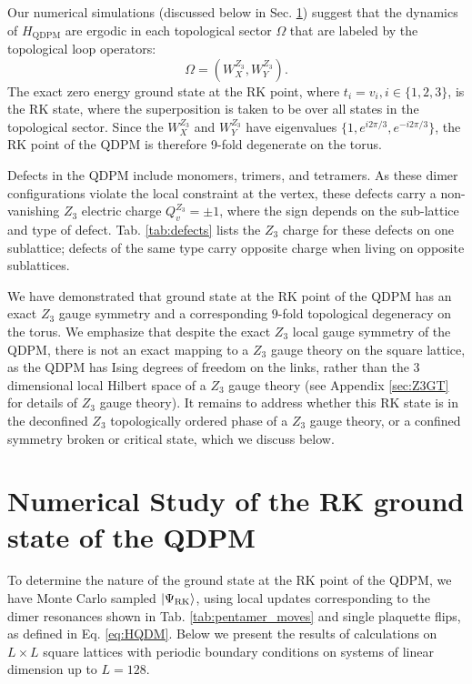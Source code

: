 \documentclass[twocolumn,prb,aps,floatfix,superscriptaddress]{revtex4-1}
\newcommand{\secref}[1]{Sec. \ref{#1}}
\newcommand{\tabref}[1]{Tab. \ref{#1}}
\newcommand{\appref}[1]{Appendix \ref{#1}}
\newcommand{\ket}[1]{| #1 \rangle}
\newcommand{\Eqref}[1]{Eq. \eqref{#1}}
\newcommand{\HQDPM}{H_\mathrm{QDPM}}
\begin{document}
Our numerical simulations (discussed below in \secref{sec:numerics}) suggest that the dynamics of $\HQDPM$ are ergodic in each topological sector $\Omega$ that are labeled by the topological loop operators:
\begin{equation}
\Omega = \left(W_X^{Z_3},W_Y^{Z_3} \right).
\end{equation}
The exact zero energy ground state at the RK point, where $t_i=v_i, i \in \{ 1,2,3\}$, is the RK state, where the superposition is taken to be over all states in the topological sector. Since the $W_{X}^{Z_3}$ and  $W_{Y}^{Z_3}$ have eigenvalues $\{1,e^{i2\pi/3},e^{-i2\pi/3}\}$, the RK point of the QDPM is therefore 9-fold degenerate on the torus.

Defects in the QDPM include monomers, trimers, and tetramers. As these dimer configurations violate the local constraint at the vertex, these defects carry a non-vanishing $Z_3$ electric charge $Q_v^{Z_3} = \pm 1$, where the sign depends on the sub-lattice and type of defect. \tabref{tab:defects} lists the $Z_3$ charge for these defects on one sublattice; defects of the same type carry opposite charge when living on opposite sublattices.

We have demonstrated that ground state at the RK point of the QDPM has an exact $Z_3$ gauge symmetry and a corresponding $9$-fold topological degeneracy on the torus. We emphasize that despite the exact $Z_3$ local gauge symmetry of the QDPM, there is not an exact mapping to a $Z_3$ gauge theory on the square lattice, as the QDPM has Ising degrees of freedom on the links, rather than the 3 dimensional local Hilbert space of a $Z_3$ gauge theory (see \appref{sec:Z3GT} for details of $Z_3$ gauge theory).  It remains to address whether this RK state is in the deconfined $Z_3$ topologically ordered phase of a $Z_3$ gauge theory, or a confined symmetry broken or critical state, which we discuss below.


\section{Numerical Study of the RK ground state of the QDPM}
\label{sec:numerics}

To determine the nature of the ground state at the RK point of the QDPM, we have Monte Carlo sampled $\ket{\Psi_{\rm{RK}}}$, using local updates corresponding to the dimer resonances shown in \tabref{tab:pentamer_moves} and single plaquette flips, as defined in \Eqref{eq:HQDM}. Below we present the results of calculations on $L\times L$ square lattices with periodic boundary conditions on systems of linear dimension up to $L=128$.
\end{document}
